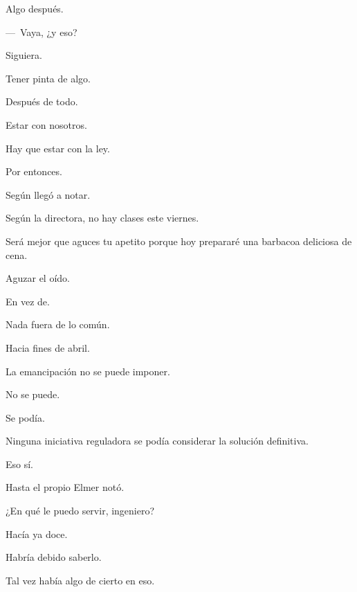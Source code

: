 \sk
Algo después. 

\sk
---~Vaya, ¿y eso? 

\sk
Siguiera. 

\sk
Tener pinta de algo. 

\sk
Después de todo. 

\sk
Estar  con nosotros. 

\sk
Hay que estar  con la ley. 

\sk
Por entonces. 

\sk
Según llegó a notar. 

\sk
Según la directora, no hay clases este viernes. 

\sk
Será mejor que aguces tu apetito porque hoy prepararé una barbacoa deliciosa de cena. 

\sk
Aguzar el oído. 

\sk
En vez de. 

\sk
Nada fuera de lo común. 

\sk
Hacia fines de abril. 

\sk
La emancipación no se puede imponer. 

\sk
No se puede. 

\sk
Se podía. 

\sk
Ninguna iniciativa reguladora se podía considerar la solución definitiva. 

\sk
Eso sí. 

\sk
Hasta el propio Elmer notó. 

\sk
¿En qué le puedo servir, ingeniero? 

\sk
Hacía ya doce. 

\sk
Habría debido saberlo. 

\sk
Tal vez había algo de cierto en eso.  

